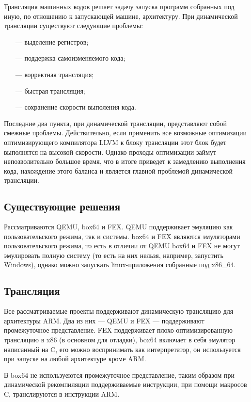 Трансляция машинных кодов решает задачу запуска программ собранных под иную, по отношению к запускающей машине, архитектуру. При динамической трансляции существуют следующие проблемы:

\begin{itemize}[leftmargin=1.6\parindent]
	\item[---] выделение регистров;
	\item[---] поддержка самоизменяемого кода;
	\item[---] корректная трансляция;
	\item[---] быстрая трансляция;
	\item[---] сохранение скорости выполения кода.
\end{itemize}

Последние два пункта, при динамической трансляции, представляют собой смежные проблемы. Действительно, если применить все возможные оптимизации оптимизирующего компилятора LLVM к блоку трансляции этот блок будет выполнятся на высокой скорости. Однако проходы оптимизации займут непозволительно большое время, что в итоге приведет к замедлению выполнения кода, нахождение этого баланса и является главной проблемой динамической трансляции. 

\subsection{Существующие решения}

Рассматриваются QEMU, box64 и FEX. QEMU поддерживает эмуляцию как пользовательского режима, так и системы. box64 и FEX являются эмуляторами пользовательского режима, то есть в отличии от QEMU box64 и FEX не могут эмулировать полную систему (то есть на них нельзя, например, запустить Windows), однако можно запускать linux-приложения собранные под x86\_64.

\subsection{Трансляция}

Все рассматриваемые проекты поддерживают динамическую трансляцию для архитектуры ARM. Два из них --- QEMU и FEX --- поддерживают промежуточное представление. FEX поддерживает плохо оптимизированную трансляцию в x86 (в основном для отладки), box64 включает в себя эмулятор написанный на C, его можно воспринимать как интерпретатор, он используется при запуске на любой архитектуре кроме ARM.

В box64 не используеются промежуточное представление, таким образом при динамической рекомпиляции поддерживаемые инструкции, при помощи макросов C, транслируются в инструкции ARM. \cite{box64_letter}


